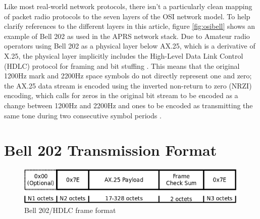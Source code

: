 \documentclass[12pt,letterpaper]{article}
\begin{document}
Like most real-world network protocols, there isn't a particularly clean
mapping of packet radio protocols to the seven layers of the OSI
network model. To help clarify references to the different layers in this article,
figure \ref{fig:osibell} shows an example of Bell 202 as used in the APRS
network stack.
Due to Amateur radio operators
using Bell 202 as a physical layer below AX.25, which is a derivative of
X.25, the physical layer implicitly includes the High-Level Data Link Control (HDLC) 
protocol for framing and bit stuffing \cite{n1vgphy}.
This means that the original 1200Hz mark and 2200Hz space symbols
do not directly represent one and zero;
the AX.25 data stream is encoded using the 
inverted non-return to zero (NRZI) encoding,
which calls for zeros in the original bit stream to be encoded as a change
between 1200Hz and 2200Hz and ones to be encoded as transmitting the same
tone during two consecutive symbol periods \cite{iso13239}.

\section{Bell 202 Transmission Format}

\begin{figure}
	\centering
	\includegraphics[width=1.0\textwidth]{src/dia/bell202}
	\caption{Bell 202/HDLC frame format}
	\label{fig:bell202format}
\end{figure}
\end{document}
